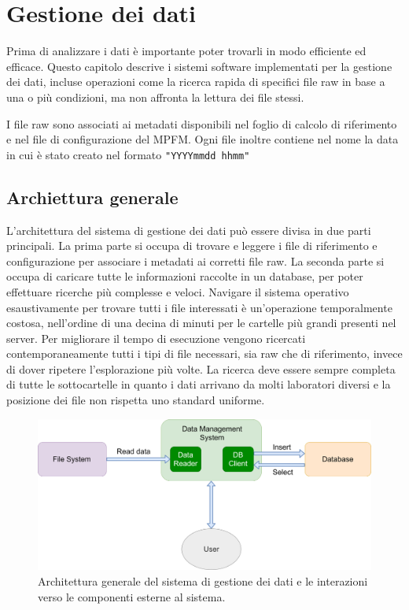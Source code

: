 \chapter{Gestione dei dati}


Prima di analizzare i dati è importante poter trovarli in modo efficiente ed efficace. Questo capitolo descrive i sistemi software implementati per la gestione dei dati, incluse operazioni come la ricerca rapida di specifici file raw in base a una o più condizioni, ma non affronta la lettura dei file stessi.

I file raw sono associati ai metadati disponibili nel foglio di calcolo di riferimento e nel file di configurazione del MPFM. Ogni file inoltre contiene nel nome la data in cui è stato creato nel formato \texttt{"YYYYmmdd hhmm"}

\section{Archiettura generale}
L'architettura del sistema di gestione dei dati può essere divisa in due parti principali. La prima parte si occupa di trovare e leggere i file di riferimento e configurazione per associare i metadati ai corretti file raw. La seconda parte si occupa di caricare tutte le informazioni raccolte in un database, per poter effettuare ricerche più complesse e veloci.
Navigare il sistema operativo esaustivamente per trovare tutti i file interessati è un'operazione temporalmente costosa, nell'ordine di una decina di minuti per le cartelle più grandi presenti nel server. Per migliorare il tempo di esecuzione vengono ricercati contemporaneamente tutti i tipi di file necessari, sia raw che di riferimento, invece di dover ripetere l'esplorazione più volte.
La ricerca deve essere sempre completa di tutte le sottocartelle in quanto i dati arrivano da molti laboratori diversi e la posizione dei file non rispetta uno standard uniforme.


\begin{figure}
	\includegraphics[width=\textwidth]{figures/ArchitetturaDMD}
	\caption[Architettura sistema di gestione dei dati]{Architettura generale del sistema di gestione dei dati e le interazioni verso le componenti esterne al sistema. 
		\label{fig:ArchietturaDMD}}
\end{figure}

